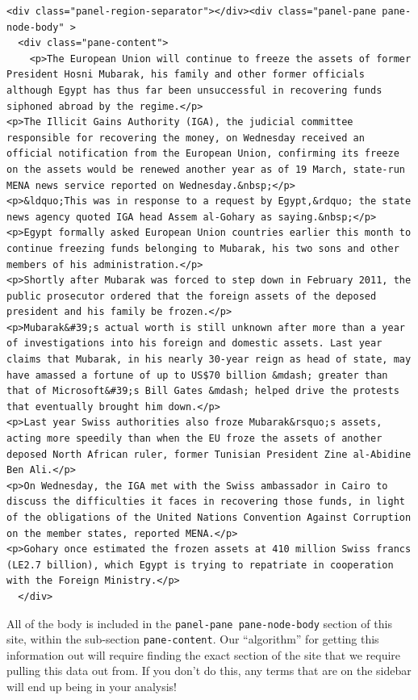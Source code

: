 \documentclass[11pt]{article}
\begin{document}
\begin{verbatim}
<div class="panel-region-separator"></div><div class="panel-pane pane-node-body" >    
  <div class="pane-content">
    <p>The European Union will continue to freeze the assets of former President Hosni Mubarak, his family and other former officials although Egypt has thus far been unsuccessful in recovering funds siphoned abroad by the regime.</p>
<p>The Illicit Gains Authority (IGA), the judicial committee responsible for recovering the money, on Wednesday received an official notification from the European Union, confirming its freeze on the assets would be renewed another year as of 19 March, state-run MENA news service reported on Wednesday.&nbsp;</p>
<p>&ldquo;This was in response to a request by Egypt,&rdquo; the state news agency quoted IGA head Assem al-Gohary as saying.&nbsp;</p>
<p>Egypt formally asked European Union countries earlier this month to continue freezing funds belonging to Mubarak, his two sons and other members of his administration.</p>
<p>Shortly after Mubarak was forced to step down in February 2011, the public prosecutor ordered that the foreign assets of the deposed president and his family be frozen.</p>
<p>Mubarak&#39;s actual worth is still unknown after more than a year of investigations into his foreign and domestic assets. Last year claims that Mubarak, in his nearly 30-year reign as head of state, may have amassed a fortune of up to US$70 billion &mdash; greater than that of Microsoft&#39;s Bill Gates &mdash; helped drive the protests that eventually brought him down.</p>
<p>Last year Swiss authorities also froze Mubarak&rsquo;s assets, acting more speedily than when the EU froze the assets of another deposed North African ruler, former Tunisian President Zine al-Abidine Ben Ali.</p>
<p>On Wednesday, the IGA met with the Swiss ambassador in Cairo to discuss the difficulties it faces in recovering those funds, in light of the obligations of the United Nations Convention Against Corruption on the member states, reported MENA.</p>
<p>Gohary once estimated the frozen assets at 410 million Swiss francs (LE2.7 billion), which Egypt is trying to repatriate in cooperation with the Foreign Ministry.</p>
  </div>
\end{verbatim}
All of the body is included in the \texttt{panel-pane pane-node-body} section
of this site, within the sub-section \texttt{pane-content}.  Our ``algorithm''
for getting this information out will require finding the exact
section of the site that we require pulling this data out from.  If
you don't do this, any terms that are on the sidebar will end up being
in your analysis!
\end{document}

